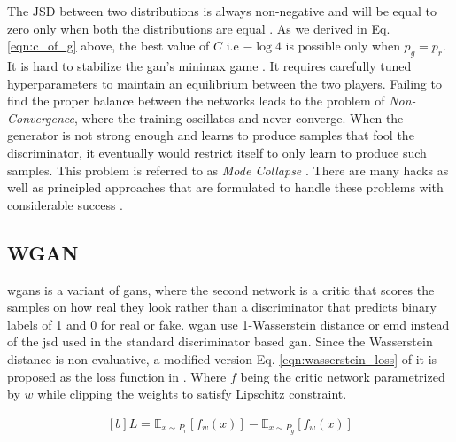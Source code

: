 The \ac{JSD} between two distributions is always non-negative and will be equal to zero only when both the distributions are equal \cite{js_divergence}. As we derived in Eq. \ref{eqn:c_of_g} above, the best value of $C$ i.e $-\log 4$ is possible only when $p_{g}=p_{r}$. It is hard to stabilize the \ac{gan}'s minimax game \cite{martin2017principled}. It requires carefully tuned hyperparameters to maintain an equilibrium between the two players. Failing to find the proper balance between the networks leads to the problem of \textit{Non-Convergence}, where the training oscillates and never converge. When the generator is not strong enough and learns to produce samples that fool the discriminator, it eventually would restrict itself to only learn to produce such samples. This problem is referred to as \textit{Mode Collapse} \cite{commonganprobs}. There are many hacks as well as principled approaches that are formulated to handle these problems with considerable success \cite{openaigan2wgan}.

\subsection{WGAN}
\acp{wgan} is a variant of \acp{gan}, where the second network is a critic that scores the samples on how real they look rather than a discriminator that predicts binary labels of 1 and 0 for real or fake. \ac{wgan} use 1-Wasserstein distance \cite{wasserstein_metric_2020} or \ac{emd} instead of the \ac{jsd} used in the standard discriminator based \ac{gan}. Since the Wasserstein distance is non-evaluative, a modified version Eq. \ref{eqn:wasserstein_loss} of it is proposed as the loss function in \cite{soumith2017wasserstein}. Where $f$ being the critic network parametrized by $w$ while clipping the weights to satisfy Lipschitz constraint.

\begin{equation} \label{eqn:wasserstein_loss}
    \begin{aligned}[b]
        L=\mathbb{E}_{x \sim P_{r}}\left[f_{w}(x)\right]-\mathbb{E}_{x \sim P_{g}}\left[f_{w}(x)\right]
    \end{aligned}
\end{equation}



